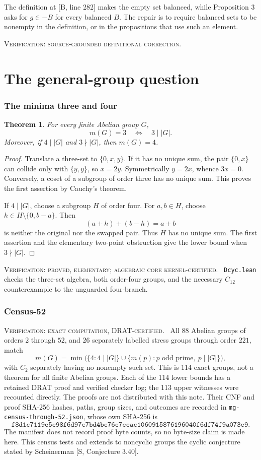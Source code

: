 \documentclass[10pt]{article}
\newcommand{\tier}[1]{\par\smallskip\noindent\textsc{Verification: #1.}\ }
\theoremstyle{plain}
\newtheorem*{theorem}{Theorem}
\begin{document}
The definition at [B, line 282] makes the empty set balanced, while
Proposition 3 asks for $g\in-B$ for every balanced $B$. The repair is to
require balanced sets to be nonempty in the definition, or in the
propositions that use such an element.
\tier{source-grounded definitional correction}

\part{The general-group question}

\section{The minima three and four}

\begin{theorem}
For every finite Abelian group $G$,
\[
 m(G)=3\quad\Longleftrightarrow\quad3\mid|G|.
\]
Moreover, if $4\mid|G|$ and $3\nmid|G|$, then $m(G)=4$.
\end{theorem}

\begin{proof}
Translate a three-set to $\{0,x,y\}$. If it has no unique sum, the pair
$\{0,x\}$ can collide only with $\{y,y\}$, so $x=2y$. Symmetrically
$y=2x$, whence $3x=0$. Conversely, a coset of a subgroup of order three has
no unique sum. This proves the first assertion by Cauchy's theorem.

If $4\mid|G|$, choose a subgroup $H$ of order four. For $a,b\in H$, choose
$h\in H\setminus\{0,b-a\}$. Then
\[
 (a+h)+(b-h)=a+b
\]
is neither the original nor the swapped pair. Thus $H$ has no unique sum.
The first assertion and the elementary two-point obstruction give the lower
bound when $3\nmid|G|$.
\end{proof}
\tier{proved, elementary; algebraic core kernel-certified}
\texttt{Dcyc.lean} checks the three-set algebra, both order-four groups, and
the necessary $C_{12}$ counterexample to the unguarded four-branch.

\section{Census-52}

\tier{exact computation, DRAT-certified}
All 88 Abelian groups of orders $2$ through $52$, and 26 separately labelled
stress groups through order $221$, match
\[
 m(G)=\min\bigl(\{4:4\mid|G|\}\cup
 \{m(p):p\text{ odd prime},\ p\mid|G|\}\bigr),       \tag{2}
\]
with $C_2$ separately having no nonempty such set. This is 114 exact groups,
not a theorem for all finite Abelian groups. Each of the 114 lower bounds has
a retained DRAT proof and verified checker log; the 113 upper witnesses were
recounted directly. The proofs are not distributed with this note. Their
CNF and proof SHA-256 hashes, paths, group sizes, and outcomes are recorded
in \texttt{mg-census-through-52.json}, whose own SHA-256 is
\[
\texttt{f8d1c7119e5e98f6d97c7bd4bc76e7eeac1060915876196040f6df74f9a073e9}.
\]
The manifest does not record proof byte counts, so no byte-size claim is made
here.
This census tests and extends to noncyclic groups the cyclic conjecture stated
by Scheinerman [S, Conjecture 3.40].
\end{document}
